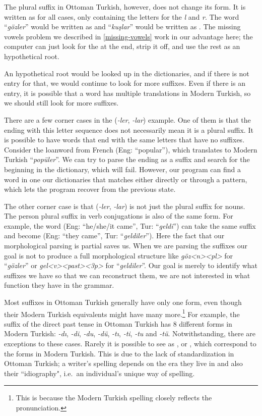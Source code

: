\documentclass[10pt,twocolumn]{article}
\theoremstyle{nonumberplain}
\newcommand{\otto}[1]{\RLE{\ottoman{}\Large{}#1}}
\newcommand{\word}[1]{``\emph{#1}''}
\begin{document}
The plural suffix in Ottoman Turkish, however, does not change its form. It is
written as \otto{-لر} for all cases, only containing the letters for the
\emph{l} and \emph{r}.
The word \word{gözler} would be written as \otto{گوزلر} and \word{kuşlar} would
be written as \otto{قوشلر}.
The missing vowels problem we described in \autoref{missing-vowels} work in our
advantage here; the computer can just look for the \otto{-لر} at the end, strip it off, and
use the rest as an hypothetical root.

An hypothetical root would be looked up in the dictionaries, and if there is
not entry for that, we would continue to look for more suffixes. Even if there
is an entry, it is possible that a word has multiple translations in Modern
Turkish, so we should still look for more suffixes.

There are a few corner cases in the \otto{-لر} (\emph{-ler}, \emph{-lar})
example. One of them is that the ending with this letter sequence does not
necessarily mean it is a plural suffix. It is possible to have words that end
with the same letters that have no suffixes. Consider the loanword from French
\otto{پوپولر} (Eng: ``popular''), which translates to Modern Turkish
\word{popüler}. We can try to parse the ending as a suffix and search for the
beginning in the dictionary, which will fail. However, our program can find a
word in one our dictionaries that matches either directly or through a pattern,
which lets the program recover from the previous state.


The other corner case is that \otto{-لر} (\emph{-ler}, \emph{-lar}) is not just
the plural suffix for nouns. The  person plural suffix in verb
conjugations is also of the same form. For example, the word \otto{گلدى} (Eng: ``he/she/it came'', Tur: \word{geldi}) can take the same suffix and become \otto{گلديلر} (Eng: ``they came'', Tur: \word{geldiler}).
Here the fact that our morphological parsing is partial saves us.
When we are parsing the suffixes our goal is not to produce a full
morphological structure like \emph{göz<n><pl>} for \word{gözler} or
\emph{gel<v><past><3p>} for \word{geldiler}. Our goal is merely to identify what
suffixes we have so that we can reconstruct them, we are not interested in what
function they have in the grammar.

Most suffixes in Ottoman Turkish generally have only one form, even though their Modern Turkish equivalents might have many more.\footnote{This is because the Modern Turkish spelling closely reflects the pronunciation.} For example, the suffix of the direct past tense \otto{-دى} in Ottoman Turkish has 8 different forms in Modern Turkish:
\emph{-dı}, \emph{-di}, \emph{-du}, \emph{-dü}, \emph{-tı}, \emph{-ti}, \emph{-tu} and \emph{-tü}.
Notwithstanding, there are exceptions to these cases. Rarely it is possible to
see \otto{-دى} as \otto{-دو}, \otto{-تى} or \otto{-تو}, which correspond to the
forms in Modern Turkish. This is due to the lack of standardization in Ottoman
Turkish; a writer's spelling depends on the era they live in and also their
``idiography", i.e.\ an individual's unique way of spelling.
\end{document}
